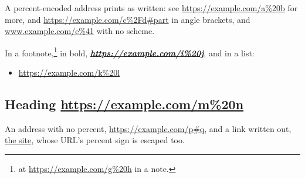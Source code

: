 A percent-encoded address prints as written: see \href{https://example.com/a\%20b}{https://example.com/a\%20b} for
more, and \href{https://example.com/c\%2Fd\#part}{https://example.com/c\%2Fd\#part} in angle brackets, and
\href{http://www.example.com/e\%41}{www.example.com/e\%41} with no scheme.

In a footnote,\footnote{at \href{https://example.com/g\%20h}{https://example.com/g\%20h} in a note.} in bold,
\textbf{\emph{\href{https://example.com/i\%20j}{https://example.com/i\%20j}}}, and in a list:

\begin{itemize}
\item \href{https://example.com/k\%20l}{https://example.com/k\%20l}
\end{itemize}

\subsection{Heading \href{https://example.com/m\%20n}{https://example.com/m\%20n}}

An address with no percent, \href{https://example.com/p\#q}{https://example.com/p\#q}, and a link written out,
\href{https://example.com/r\%20s}{the site}, whose URL's percent sign is escaped too.

